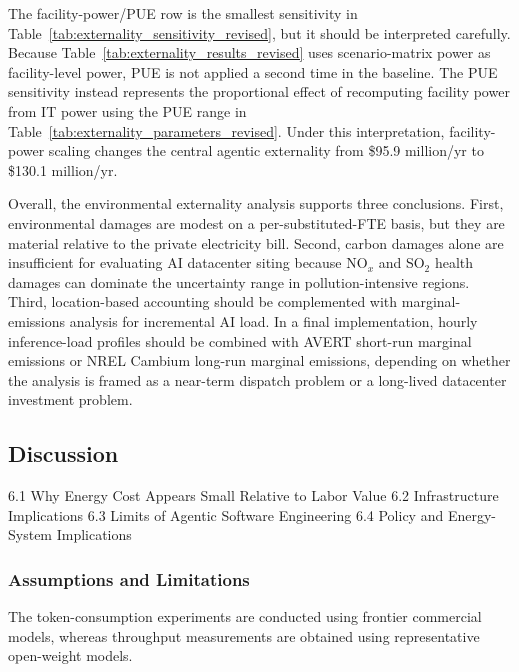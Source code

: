 \documentclass{article}
\begin{document}
The facility-power/PUE row is the smallest sensitivity in Table~\ref{tab:externality_sensitivity_revised}, but it should be interpreted carefully. Because Table~\ref{tab:externality_results_revised} uses scenario-matrix power as facility-level power, PUE is not applied a second time in the baseline. The PUE sensitivity instead represents the proportional effect of recomputing facility power from IT power using the PUE range in
Table~\ref{tab:externality_parameters_revised}. Under this interpretation, facility-power scaling changes the central agentic externality from \$95.9 million/yr to \$130.1 million/yr.

Overall, the environmental externality analysis supports three conclusions. First, environmental damages are modest on a per-substituted-FTE basis, but they are material relative to the private electricity bill. Second, carbon damages alone are insufficient for evaluating AI datacenter siting because NO$_x$ and SO$_2$ health damages can dominate the uncertainty range in pollution-intensive regions. Third, location-based accounting
should be complemented with marginal-emissions analysis for incremental AI load. In a final implementation, hourly inference-load profiles should be combined with AVERT short-run marginal emissions or NREL Cambium long-run marginal emissions, depending on whether the analysis is framed as a near-term dispatch problem or a long-lived datacenter investment problem.








\subsection{Discussion}
\label{sec:discussion}

6.1 Why Energy Cost Appears Small Relative to Labor Value
    6.2 Infrastructure Implications
    6.3 Limits of Agentic Software Engineering
    6.4 Policy and Energy-System Implications

\subsubsection{Assumptions and Limitations}

The token-consumption experiments are conducted using
frontier commercial models,
whereas throughput measurements are obtained using
representative open-weight models.
\end{document}

